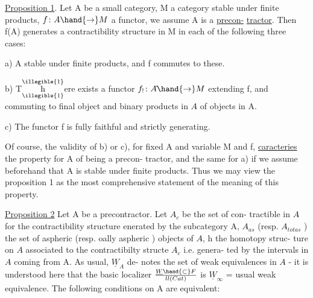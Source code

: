 \uline{Proposition 1}. Let A be a small category, M a category stable under
finite products, $f\colon A\hand{\to} M$ a functor, we assume A is a  \uline{precon-}%
\uline{tractor}. Then f(A) generates a contractibility structure in M in
each of the following three cases:

a) A stable under finite products, and f commutes to these.

b) T$\overset{\illegible{1}}{\underset{\illegible{1}}{\text{h}}}$ere exists a functor $f_{!}\colon A\hat{}\hand{\to} M$ extending f, and commuting
to final object and binary products in $A\hat{}$ of objects in A.

c) The functor f is fully faithful and strictly generating.

Of course, the validity of   b) or c), for fixed A and
variable M and f, \uline{caracteries} the property for A of being a precon-%
tractor, and the same for a) if we assume beforehand that A is stable
under finite products. Thus we may view the proposition 1 as the most
comprehensive statement of  the meaning of this property.

\uline{Proposition 2} Let A be a precontractor. Let $A\hat{}_{c}$ be the set of con-%
tractible  in $A\hat{}$ for the contractibility structure 
enerated by the subcategory A, $A\hat{}_{as}$ (resp. $A\hat{}_{totas}$ ) the set of
aspheric (resp. oally aspheric ) objects of $A\hat{}$, h the homotopy struc-%
ture on $A\hat{}$ associated to the contractibilty structe $A\hat{}_{c}$ i.e. genera-%
ted by the  intervals in $A\hat{}$ coming from A. As usual, $\underline{W}_{A}$ de-%
notes the set of weak equivalences in $A\hat{}$ - it is understood here that
the basic localizer $\underline{W}\hand{\subset} F\over{l}{l}(Cat)$ is $\underline{W}_{\infty}$ = usual weak equivalence.
The following conditions on A are equivalent:

